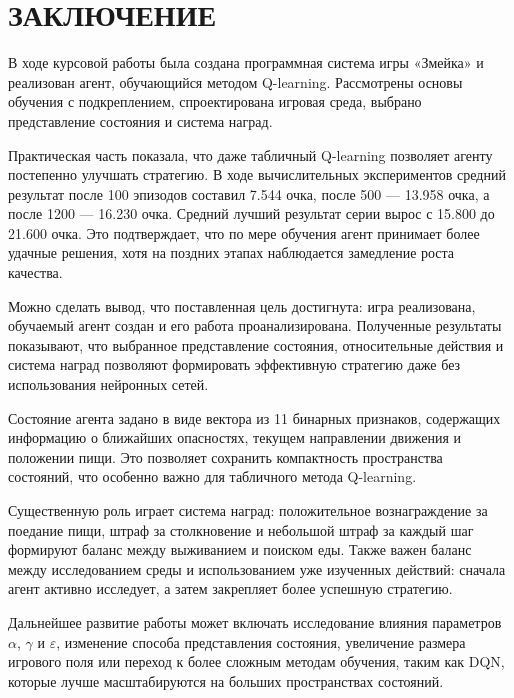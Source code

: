 \chapter*{\large ЗАКЛЮЧЕНИЕ}

В ходе курсовой работы была создана программная система игры «Змейка» и реализован агент, обучающийся методом Q-learning. Рассмотрены основы обучения с подкреплением, спроектирована игровая среда, выбрано представление состояния и система наград.

Практическая часть показала, что даже табличный Q-learning позволяет агенту постепенно улучшать стратегию. В ходе вычислительных экспериментов средний результат после 100 эпизодов составил 7.544 очка, после 500 --- 13.958 очка, а после 1200 --- 16.230 очка. Средний лучший результат серии вырос с 15.800 до 21.600 очка. Это подтверждает, что по мере обучения агент принимает более удачные решения, хотя на поздних этапах наблюдается замедление роста качества.

Можно сделать вывод, что поставленная цель достигнута: игра реализована, обучаемый агент создан и его работа проанализирована. Полученные результаты показывают, что выбранное представление состояния, относительные действия и система наград позволяют формировать эффективную стратегию даже без использования нейронных сетей.

Состояние агента задано в виде вектора из 11 бинарных признаков, содержащих информацию о ближайших опасностях, текущем направлении движения и положении пищи. Это позволяет сохранить компактность пространства состояний, что особенно важно для табличного метода Q-learning.

Существенную роль играет система наград: положительное вознаграждение за поедание пищи, штраф за столкновение и небольшой штраф за каждый шаг формируют баланс между выживанием и поиском еды. Также важен баланс между исследованием среды и использованием уже изученных действий: сначала агент активно исследует, а затем закрепляет более успешную стратегию.

Дальнейшее развитие работы может включать исследование влияния параметров $\alpha$, $\gamma$ и $\varepsilon$, изменение способа представления состояния, увеличение размера игрового поля или переход к более сложным методам обучения, таким как DQN, которые лучше масштабируются на больших пространствах состояний.